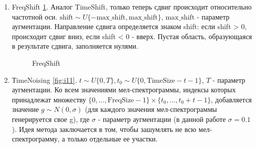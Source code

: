 \documentclass[12pt, fleqn]{article}
\begin{document}
	\begin{enumerate}
		\item FreqShift \ref{fig:i10}. \newline Аналог TimeShift, только теперь сдвиг происходит относительно частотной оси. \newline
		$\text{shift} \sim U\{-\text{max\_shift}, \text{max\_shift}\}$, $\text{max\_shift}$ - параметр аугментации. Направление сдвига определяется знаком shift: если shift > 0, происходит сдвиг вниз, если shift < 0 - вверх. Пустая область, образующаяся в результате сдвига, заполняется нулями.
		\begin{figure}[h]
			\caption{FreqShift}
			\label{fig:i10}
		\end{figure}
		\item ТimeNoising \ref{fig:i11}. \newline
		$t \sim U\{0, T\}, t_0 \sim U\{0, \text{TimeSize} - t - 1\}$, $T$ - параметр аугментации. \newline Ко всем  значениями мел-спектрограммы, индексы которых принадлежат множеству $\{0, \ldots, \text{FreqSize} - 1\} \times \{t_0, \ldots, t_0 + t - 1\}$, добавляется значение $g \sim N(0, \sigma)$ (для каждого значения мел-спектрограммы генерируется свое g), где $\sigma$ - параметр аугментации (в данной работе $\sigma = 0.1$). Идея метода заключается в том, чтобы зашумлять не всю мел-спектрограмму, а только отдельные ее участки.
		\begin{figure}[h]

\end{figure}
\end{enumerate}
\end{document}
